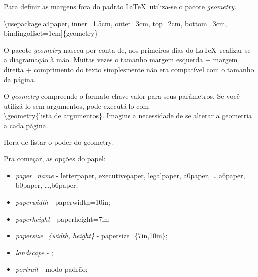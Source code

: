 \documentclass[a4paper, 12pts]{book}
\begin{document}
Para definir as margens fora do padrão \LaTeX\ utiliza-se o pacote \emph{geometry}.

\textbackslash usepackage[a4paper, inner=1.5cm, outer=3cm, top=2cm, bottom=3cm, bindingoffset=1cm]\{geometry\}

O pacote \emph{geometry} nasceu por conta de, nos primeiros dias do \LaTeX\, realizar-se a diagramação à mão.
Muitas vezes o tamanho margem esquerda + margem direita + comprimento do texto 
simplesmente não era compatível com o tamanho da página.

O \emph{geometry} compreende o formato chave-valor para seus parâmetros.
Se você utilizá-lo sem argumentos, pode executá-lo com \\
\textbackslash geometry\{lista de argumentos\}.
Imagine a necessidade de se alterar a geometria a cada página.

Hora de listar o poder do geometry:

Pra começar, as opções do papel:
\begin{itemize}
    \item \emph{paper=name} - letterpaper, executivepaper, legalpaper, a0paper, \ldots ,a6paper, b0paper, \ldots ,b6paper;
    \item \emph{paperwidth} - paperwidth=10in;
    \item \emph{paperheight} - paperheight=7in;
    \item \emph{papersize=\{width, height\}} - papersize=\{7in,10in\};
    \item \emph{landscape} - ;
    \item \emph{portrait} - modo padrão;
\end{itemize}
\end{document}
